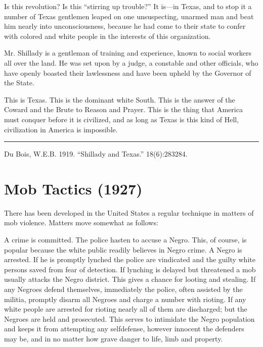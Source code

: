 \documentclass[letterpaper,10pt,english]{jupyterBook}
\begin{document}
\sphinxAtStartPar
Is this revolution? Is this “stirring up trouble?” It is—in Texas, and to stop it a number of Texas gentlemen leaped on one unsuspecting, unarmed man and beat him nearly into unconsciousness, because he had come to their state to confer with colored and white people in the interests of this organization.

\sphinxAtStartPar
Mr. Shillady is a gentleman of training and experience, known to social workers all over the land. He was set upon by a judge, a constable and other officials, who have openly boasted their lawlessness and have been upheld by the Governor of the State.

\sphinxAtStartPar
This is Texas. This is the dominant white South. This is the answer of the Coward and the Brute to Reason and Prayer. This is the thing that America must conquer before it is civilized, and as long as Texas is this kind of Hell, civilization in America is impossible.


\bigskip\hrule\bigskip


\sphinxAtStartPar
{} Du Bois, W.E.B. 1919. “Shillady and Texas.”  18(6):283\sphinxhyphen{}284.


\section{Mob Tactics (1927)}
\label{\detokenize{Volumes/34/06/mob_tactics:mob-tactics-1927}}\label{\detokenize{Volumes/34/06/mob_tactics::doc}}
\sphinxAtStartPar
There has been developed in the United States a regular technique in matters of mob violence. Matters move somewhat as follows:

\sphinxAtStartPar
A crime is committed. The police hasten to accuse a Negro. This, of course, is popular because the white public readily believes in Negro crime. A Negro is arrested. If he is promptly lynched the police are vindicated and the guilty white persons saved from fear of detection. If lynching is delayed but threatened a mob usually attacks the Negro district. This gives a chance for looting and stealing. If any Negroes defend themselves, immediately the police, often assisted by the militia, promptly disarm all Negroes and charge a number with rioting. If any white people are arrested for rioting nearly all of them are discharged; but the Negroes are held and prosecuted. This serves to intimidate the Negro population and keeps it from attempting any self\sphinxhyphen{}defense, however innocent the defenders may be, and in no matter how grave danger to life, limb and property.
\end{document}
